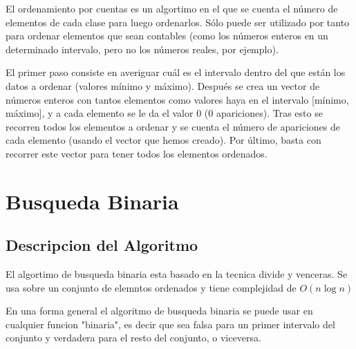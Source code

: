 El ordenamiento por cuentas es un algortimo en el que se cuenta el número de elementos de cada clase para luego ordenarlos. Sólo puede ser utilizado por tanto para ordenar elementos que sean contables (como los números enteros en un determinado intervalo, pero no los números reales, por ejemplo).

El primer paso consiste en averiguar cuál es el intervalo dentro del que están los datos a ordenar (valores mínimo y máximo). Después se crea un vector de números enteros con tantos elementos como valores haya en el intervalo [mínimo, máximo], y a cada elemento se le da el valor 0 (0 apariciones). Tras esto se recorren todos los elementos a ordenar y se cuenta el número de apariciones de cada elemento (usando el vector que hemos creado). Por último, basta con recorrer este vector para tener todos los elementos ordenados.

\section{Busqueda Binaria}

\subsection{Descripcion del Algoritmo}

El algortimo de busqueda binaria esta basado en la tecnica divide y venceras. Se usa sobre un conjunto de elemntos ordenados y tiene complejidad de $ O(n \log n) $

En una forma general el algoritmo de busqueda binaria se puede usar en cualquier funcion "binaria", es decir que sea falsa para un primer intervalo del conjunto y verdadera para el resto del conjunto, o viceversa.

